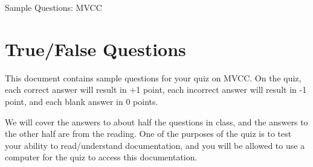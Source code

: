 \documentclass{exam}
\theoremstyle{definition}
\begin{document}
\begin{center}
\Huge
Sample Questions: MVCC
\end{center}


\section{True/False Questions}

This document contains sample questions for your quiz on MVCC.
On the quiz,
each correct answer will result in +1 point,
each incorrect answer will result in -1 point,
and each blank answer in 0 points.

We will cover the answers to about half the questions in class,
and the answers to the other half are from the reading.
One of the purposes of the quiz is to test your ability to read/understand documentation,
and you will be allowed to use a computer for the quiz to access this documentation.

\end{document}
